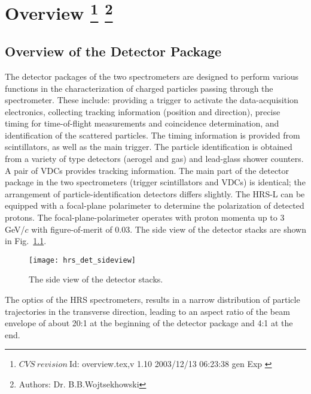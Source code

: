 \chapter[Overview]{Overview
\footnote{
  $CVS~revision~ $Id: overview.tex,v 1.10 2003/12/13 06:23:38 gen Exp $ $
}
\footnote{Authors: Dr. B.B.Wojtsekhowski }
}
\label{chap:hrs_det}

\section{Overview of the Detector Package}

The detector packages of the two spectrometers are designed 
to perform various functions 
in the characterization of charged particles passing through the spectrometer. 
These include: providing a trigger to activate the data-acquisition 
electronics, collecting tracking information (position and direction), 
precise timing for time-of-flight measurements and coincidence determination, 
and identification of the scattered particles. 
The timing information is provided from scintillators, as well as the
main trigger. The particle identification is obtained from a 
variety of \Cherenkov{}  type detectors (aerogel and gas) and 
lead-glass shower counters. 
A pair of VDCs provides tracking information.
The main part of the detector package in the two spectrometers 
(trigger scintillators and VDCs) is identical; 
the arrangement of particle-identification detectors differs slightly.
The HRS-L can be equipped with a focal-plane polarimeter to determine 
the polarization of detected protons.
The focal-plane-polarimeter operates with proton momenta up 
to 3 GeV/$c$ with figure-of-merit of 0.03.
The side view of the detector stacks are shown in Fig.~\ref{fig:side-view}.
%
\begin{figure}[p]
\texttt{[image: hrs\_det\_sideview]}
\caption[The side view of the detector stacks]
{The side view of the detector stacks.}
\label{fig:side-view}
\end{figure}
%

The optics of the HRS spectrometers, results in a narrow distribution of 
particle trajectories in the transverse direction, leading 
to an aspect ratio of the beam envelope of about 20:1 at 
the beginning of the detector package and 4:1 at the end.

